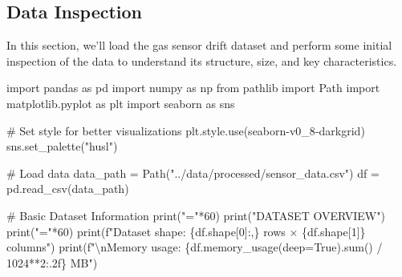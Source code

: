 \documentclass[
  letterpaper,
  DIV=11,
  numbers=noendperiod]{scrartcl}
\newenvironment{Shaded}{\begin{snugshade}}{\end{snugshade}}
\newcommand{\BuiltInTok}[1]{\textcolor[rgb]{0.00,0.23,0.31}{#1}}
\newcommand{\CharTok}[1]{\textcolor[rgb]{0.13,0.47,0.30}{#1}}
\newcommand{\CommentTok}[1]{\textcolor[rgb]{0.37,0.37,0.37}{#1}}
\newcommand{\DecValTok}[1]{\textcolor[rgb]{0.68,0.00,0.00}{#1}}
\newcommand{\ImportTok}[1]{\textcolor[rgb]{0.00,0.46,0.62}{#1}}
\newcommand{\NormalTok}[1]{\textcolor[rgb]{0.00,0.23,0.31}{#1}}
\newcommand{\OperatorTok}[1]{\textcolor[rgb]{0.37,0.37,0.37}{#1}}
\newcommand{\SpecialCharTok}[1]{\textcolor[rgb]{0.37,0.37,0.37}{#1}}
\newcommand{\SpecialStringTok}[1]{\textcolor[rgb]{0.13,0.47,0.30}{#1}}
\newcommand{\StringTok}[1]{\textcolor[rgb]{0.13,0.47,0.30}{#1}}
\newcommand{\VariableTok}[1]{\textcolor[rgb]{0.07,0.07,0.07}{#1}}
\renewenvironment{Shaded}{%
  \begin{tcolorbox}[%
    enhanced,%
    colback=codebg,%
    colframe=codebg,%
    borderline west={3pt}{0pt}{sectionblue},%
    fontupper=\small\ttfamily,%
    boxrule=0pt,%
    arc=0pt,%
    boxsep=5pt,%
    left=2mm,%
    right=2mm,%
    top=2mm,%
    bottom=2mm%
  ]%
}{%
  \end{tcolorbox}%
}
\begin{document}
\subsection{Data Inspection}\label{data-inspection}

In this section, we'll load the gas sensor drift dataset and perform
some initial inspection of the data to understand its structure, size,
and key characteristics.

\begin{Shaded}
\begin{Highlighting}[]
\ImportTok{import}\NormalTok{ pandas }\ImportTok{as}\NormalTok{ pd}
\ImportTok{import}\NormalTok{ numpy }\ImportTok{as}\NormalTok{ np}
\ImportTok{from}\NormalTok{ pathlib }\ImportTok{import}\NormalTok{ Path}
\ImportTok{import}\NormalTok{ matplotlib.pyplot }\ImportTok{as}\NormalTok{ plt}
\ImportTok{import}\NormalTok{ seaborn }\ImportTok{as}\NormalTok{ sns}

\CommentTok{\# Set style for better visualizations}
\NormalTok{plt.style.use(}\StringTok{\textquotesingle{}seaborn{-}v0\_8{-}darkgrid\textquotesingle{}}\NormalTok{)}
\NormalTok{sns.set\_palette(}\StringTok{"husl"}\NormalTok{)}

\CommentTok{\# Load data}
\NormalTok{data\_path }\OperatorTok{=}\NormalTok{ Path(}\StringTok{"../data/processed/sensor\_data.csv"}\NormalTok{)}
\NormalTok{df }\OperatorTok{=}\NormalTok{ pd.read\_csv(data\_path)}

\CommentTok{\# Basic Dataset Information}
\BuiltInTok{print}\NormalTok{(}\StringTok{"="}\OperatorTok{*}\DecValTok{60}\NormalTok{)}
\BuiltInTok{print}\NormalTok{(}\StringTok{"DATASET OVERVIEW"}\NormalTok{)}
\BuiltInTok{print}\NormalTok{(}\StringTok{"="}\OperatorTok{*}\DecValTok{60}\NormalTok{)}
\BuiltInTok{print}\NormalTok{(}\SpecialStringTok{f"Dataset shape: }\SpecialCharTok{\{}\NormalTok{df}\SpecialCharTok{.}\NormalTok{shape[}\DecValTok{0}\NormalTok{]}\SpecialCharTok{:,\}}\SpecialStringTok{ rows × }\SpecialCharTok{\{}\NormalTok{df}\SpecialCharTok{.}\NormalTok{shape[}\DecValTok{1}\NormalTok{]}\SpecialCharTok{\}}\SpecialStringTok{ columns"}\NormalTok{)}
\BuiltInTok{print}\NormalTok{(}\SpecialStringTok{f"}\CharTok{\textbackslash{}n}\SpecialStringTok{Memory usage: }\SpecialCharTok{\{}\NormalTok{df}\SpecialCharTok{.}\NormalTok{memory\_usage(deep}\OperatorTok{=}\VariableTok{True}\NormalTok{)}\SpecialCharTok{.}\BuiltInTok{sum}\NormalTok{() }\OperatorTok{/} \DecValTok{1024}\OperatorTok{**}\DecValTok{2}\SpecialCharTok{:.2f\}}\SpecialStringTok{ MB"}\NormalTok{)}


\end{Highlighting}
\end{Shaded}
\end{document}
